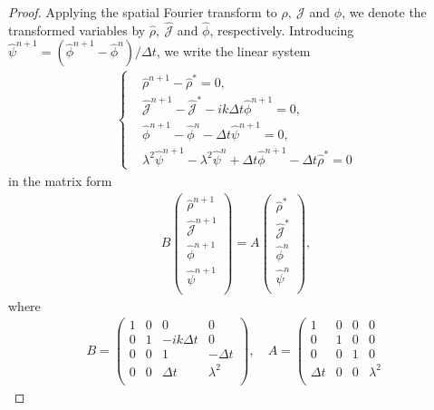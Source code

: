 \documentclass[10pt,a4paper]{amsart}
\begin{document}
\begin{proof}
Applying the spatial Fourier transform to $\rho,~\mathcal{J}$ and $\phi$, we denote the transformed variables by $\hat\rho,~\hat{\mathcal{J}}$ and $\hat\phi$, respectively. Introducing $\hat\psi^{n+1}=(\hat\phi^{n+1}-\hat\phi^n)/\Delta t$, we write
the linear system
\begin{align}
    \left\{
        \begin{aligned}
            &\hat\rho^{n+1}-\hat\rho^*=0,\\
            &\hat {\mathcal{J}}^{n+1}-\hat{\mathcal{J}}^*-ik\Delta t\hat\phi^{n+1}=0,\\
            &\hat\phi^{n+1}-\hat\phi^n-\Delta t\hat\psi^{n+1}=0,\\
            &\lambda^2\hat\psi^{n+1}-\lambda^2\hat\psi^n+\Delta t\hat\phi^{n+1}-\Delta t\hat\rho^*=0
        \end{aligned}
    \right.
\end{align}
in the matrix form
\begin{align}
B
    \left(
    \begin{array}{cccc}
    \hat\rho^{n+1}  \\
    \hat {\mathcal{J}}^{n+1}  \\
    \hat\phi^{n+1}   \\
    \hat\psi^{n+1}  \\
    \end{array}
\right)=A
    \left(
    \begin{array}{cccc}
    \hat\rho^*  \\
    \hat {\mathcal{J}}^*  \\
    \hat\phi^n  \\
    \hat\psi^n  \\
    \end{array}
\right),
\end{align}
where
\begin{align*}
B=\left(
\begin{array}{cccc}
    1 & 0 & 0 & 0 \\
    0 & 1 & -ik\Delta t & 0 \\
    0 & 0 & 1 & -\Delta t \\
    0 & 0 & \Delta t & \lambda^2 \\
\end{array}
\right),\quad A=\left(
\begin{array}{cccc}
    1 & 0 & 0 & 0 \\
    0 & 1 & 0 & 0 \\
    0 & 0 & 1 & 0 \\
    \Delta t & 0 & 0 & \lambda^2 \\

\end{array}
\end{align*}
\end{proof}
\end{document}
